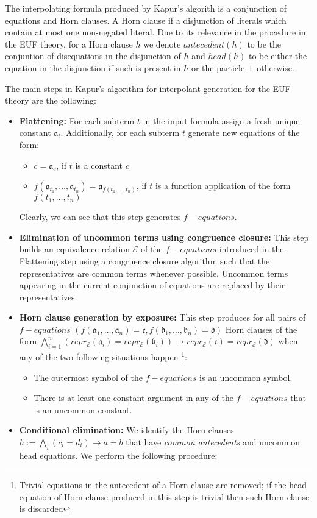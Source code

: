 The interpolating formula produced by Kapur's algorith is a conjunction of equations
and Horn clauses. A Horn clause if a disjunction of literals which contain at most
one non-negated literal.
Due to its relevance in the procedure in the EUF theory, for a Horn clause $h$
we denote $antecedent(h)$ to be the conjuntion of disequations in the disjunction of $h$ 
and $head(h)$ to be either the equation in the disjunction if such is present in $h$ 
or the particle $\bot$ otherwise.

The main steps in Kapur's algorithm for interpolant generation for the EUF theory
are the following:

\begin{itemize}
  \item \textbf{Flattening:} 
    For each subterm $t$ in the input formula assign a fresh unique constant $\mathfrak{a}_t$. 
    Additionally, for each subterm $t$ generate new equations of the form:
    \begin{itemize}
      \item $c = \mathfrak{a}_c$, if $t$ is a constant $c$
      \item $f(\mathfrak{a}_{t_1}, \dots, \mathfrak{a}_{t_n}) 
        = \mathfrak{a}_{f(t_1, \dots, t_n)}$, if $t$ is a 
        function application of the form $f(t_1, \dots, t_n)$
    \end{itemize}
    Clearly, we can see that this step generates $f-equations$.
  \item \textbf{Elimination of uncommon terms using congruence closure:}
    This step builds an equivalence 
    relation $\mathcal{E}$ of the $f-equations$ introduced in the 
    Flattening step using a congruence closure algorithm such 
    that the representatives are common terms
    whenever possible. Uncommon terms appearing in the current conjunction of 
    equations are replaced by their representatives.
  \item \textbf{Horn clause generation by exposure:} 
    This step produces for all pairs of $f-equations$ 
    $(f(\mathfrak{a}_1, \dots, \mathfrak{a}_n) = \mathfrak{c}, 
    f(\mathfrak{b}_1, \dots, \mathfrak{b}_n) = \mathfrak{d})$
    Horn clauses of the form 
    $\bigwedge_{i=1}^n(repr_{\mathcal{E}}(\mathfrak{a}_i) = repr_{\mathcal{E}}(\mathfrak{b}_i))
    \rightarrow repr_{\mathcal{E}}(\mathfrak{c}) = repr_{\mathcal{E}}(\mathfrak{d})$
    when any of the two following situations happen \footnote{Trivial equations in the antecedent
    of a Horn clause are removed; if the head equation of Horn clause produced in this 
    step is trivial then such Horn clause is discarded}:
    \begin{itemize}
      \item The outermost symbol of the $f-equations$ is an uncommon symbol.
      \item There is at least one constant argument in any of the $f-equations$ 
        that is an uncommon constant.
    \end{itemize}
  \item \textbf{Conditional elimination:} 
    We identify the Horn clauses $h := \bigwedge_i (c_i = d_i) \rightarrow a = b$
    that have \emph{common antecedents} and uncommon head equations. 
    We perform the following procedure: 


\end{itemize}
